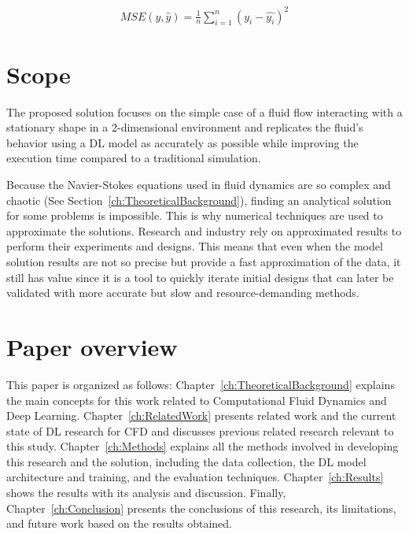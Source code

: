 \begin{equation}
    \begin{aligned}
        MSE(y, \hat{y}) = \frac{1}{n} \sum_{i=1}^{n}(y_i-\hat{y_i})^2
    \end{aligned}
    \label{eq:mse}
\end{equation}

\section{Scope}
\label{sec:Scope}
The proposed solution focuses on the simple case of a fluid flow interacting with a stationary shape in a 2-dimensional environment and replicates the fluid's behavior using a DL model as accurately as possible while improving the execution time compared to a traditional simulation. 

Because the Navier-Stokes equations used in fluid dynamics are so complex and chaotic (See Section~\ref{ch:TheoreticalBackground}), finding an analytical solution for some problems is impossible. This is why numerical techniques are used to approximate the solutions. Research and industry rely on approximated results to perform their experiments and designs. This means that even when the model solution results are not so precise but provide a fast approximation of the data, it still has value since it is a tool to quickly iterate initial designs that can later be validated with more accurate but slow and resource-demanding methods.

\section{Paper overview}
\label{sec:PaperOverview}
This paper is organized as follows: Chapter~\ref{ch:TheoreticalBackground} explains the main concepts for this work related to Computational Fluid Dynamics and Deep Learning. Chapter~\ref{ch:RelatedWork} presents related work and the current state of DL research for CFD and discusses previous related research relevant to this study. Chapter~\ref{ch:Methods} explains all the methods involved in developing this research and the solution, including the data collection, the DL model architecture and training, and the evaluation techniques. Chapter~\ref{ch:Results} shows the results with its analysis and discussion. Finally, Chapter~\ref{ch:Conclusion} presents the conclusions of this research, its limitations, and future work based on the results obtained.

